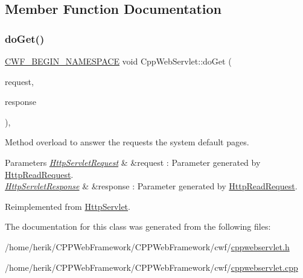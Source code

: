 \subsection{Member Function Documentation}
\mbox{\label{class_cpp_web_servlet_a8d32d5ba8ba73c10a7c1abc81497d898}} 
\subsubsection{\texorpdfstring{do\+Get()}{doGet()}}
{\footnotesize\ttfamily \hyperlink{cppwebframework__global_8h_a7492e9498cbaf9cd17dbc2215d3a0e48}{C\+W\+F\+\_\+\+B\+E\+G\+I\+N\+\_\+\+N\+A\+M\+E\+S\+P\+A\+CE} void Cpp\+Web\+Servlet\+::do\+Get (\begin{DoxyParamCaption}\item[{\hyperlink{class_http_servlet_request}{Http\+Servlet\+Request} \&}]{request,  }\item[{\hyperlink{class_http_servlet_response}{Http\+Servlet\+Response} \&}]{response }\end{DoxyParamCaption})\hspace{0.3cm}{\ttfamily [override]}, {\ttfamily [virtual]}}



Method overload to answer the requests the system default pages. 


\begin{DoxyParams}{Parameters}
{\em \hyperlink{class_http_servlet_request}{Http\+Servlet\+Request}} & \&request \+: Parameter generated by \hyperlink{class_http_read_request}{Http\+Read\+Request}. \\
\hline
{\em \hyperlink{class_http_servlet_response}{Http\+Servlet\+Response}} & \&response \+: Parameter generated by \hyperlink{class_http_read_request}{Http\+Read\+Request}. \\
\hline
\end{DoxyParams}


Reimplemented from \hyperlink{class_http_servlet_a7c851e2989b7a61e5c8470b562690516}{Http\+Servlet}.



The documentation for this class was generated from the following files\+:\begin{DoxyCompactItemize}
\item 
/home/herik/\+C\+P\+P\+Web\+Framework/\+C\+P\+P\+Web\+Framework/cwf/\hyperlink{cppwebservlet_8h}{cppwebservlet.\+h}\item 
/home/herik/\+C\+P\+P\+Web\+Framework/\+C\+P\+P\+Web\+Framework/cwf/\hyperlink{cppwebservlet_8cpp}{cppwebservlet.\+cpp}\end{DoxyCompactItemize}
